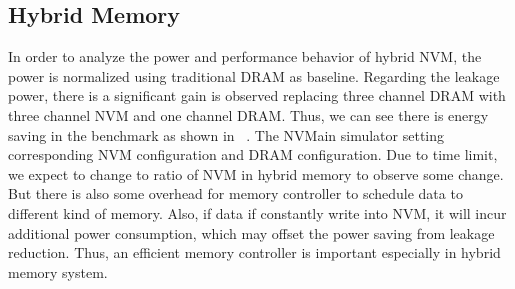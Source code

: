 \subsection{Hybrid Memory}
In order to analyze the power and performance behavior of hybrid NVM, the power is normalized using traditional DRAM as baseline. Regarding the leakage power, there is a significant gain is observed replacing three channel DRAM with three channel NVM and one channel DRAM. Thus, we can see there is energy saving in the benchmark as shown in ~. The NVMain simulator setting corresponding NVM configuration and DRAM configuration. Due to time limit, we expect to change to ratio of NVM in hybrid memory to observe some change. But there is also some overhead for memory controller to schedule data to different kind of memory. Also, if data if constantly write into NVM, it will incur additional power consumption, which may offset the power saving from leakage reduction. Thus, an efficient memory controller is important especially in hybrid memory  system. 















